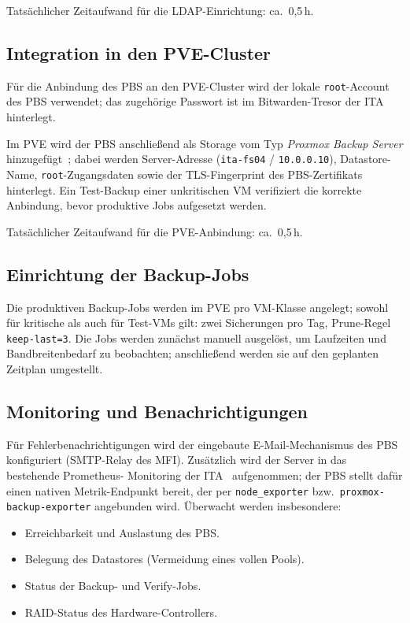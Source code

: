 Tatsächlicher Zeitaufwand für die LDAP-Einrichtung: ca.~0{,}5\,h.


\subsection{Integration in den PVE-Cluster}
\label{sec:PVEIntegration}
Für die Anbindung des \ac{PBS} an den \ac{PVE}-Cluster wird der
lokale \texttt{root}-Account des \ac{PBS} verwendet; das zugehörige
Passwort ist im Bitwarden-Tresor der \ac{ITA} hinterlegt.

Im \ac{PVE} wird der \ac{PBS} anschließend als Storage vom Typ
\emph{Proxmox Backup Server} hinzugefügt~\citep{PVEAdminGuide};
dabei werden Server-Adresse
(\texttt{ita-fs04} / \texttt{10.0.0.10}), Datastore-Name,
\texttt{root}-Zugangsdaten sowie der TLS-Fingerprint des
\ac{PBS}-Zertifikats hinterlegt.
Ein Test-Backup einer unkritischen \ac{VM} verifiziert die korrekte
Anbindung, bevor produktive Jobs aufgesetzt werden.

Tatsächlicher Zeitaufwand für die PVE-Anbindung: ca.~0{,}5\,h.


\subsection{Einrichtung der Backup-Jobs}
\label{sec:BackupJobs}
Die produktiven Backup-Jobs werden im \ac{PVE} pro \ac{VM}-Klasse
angelegt; sowohl für kritische als auch für Test-\acp{VM} gilt:
zwei Sicherungen pro Tag, Prune-Regel \texttt{keep-last=3}.
Die Jobs werden zunächst manuell ausgelöst, um Laufzeiten und
Bandbreitenbedarf zu beobachten; anschließend werden sie auf den
geplanten Zeitplan umgestellt.


\subsection{Monitoring und Benachrichtigungen}
\label{sec:Monitoring}
Für Fehlerbenachrichtigungen wird der eingebaute E-Mail-Mechanismus
des \ac{PBS} konfiguriert (SMTP-Relay des \ac{MFI}).
Zusätzlich wird der Server in das bestehende Prometheus-
Monitoring der \ac{ITA}~\citep{PrometheusDocs} aufgenommen; der
\ac{PBS} stellt dafür einen nativen Metrik-Endpunkt bereit, der per
\texttt{node\_exporter} bzw.\ \texttt{proxmox-backup-exporter}
angebunden wird.
Überwacht werden insbesondere:
\begin{itemize}
    \item Erreichbarkeit und Auslastung des \ac{PBS}.
    \item Belegung des Datastores (Vermeidung eines vollen Pools).
    \item Status der Backup- und Verify-Jobs.
    \item \ac{RAID}-Status des Hardware-Controllers.
\end{itemize}
